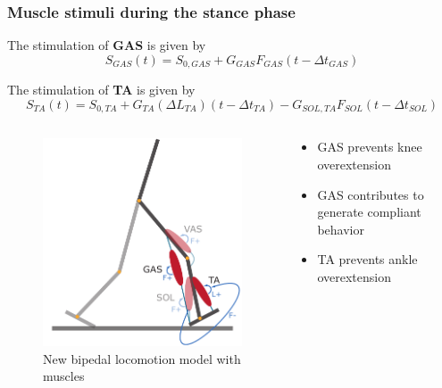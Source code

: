 \documentclass[10pt]{beamer}
\begin{document}
\begin{frame}
	\frametitle{Muscle stimuli during the stance phase}
	
	\begin{block}{}
		The stimulation of \textbf{GAS} is given by
		\begin{equation*}
			S_{GAS}(t)=S_{0,GAS} + G_{GAS} F_{GAS} (t-\Delta t_{GAS})
		\end{equation*}
	\end{block}
	\begin{block}{}
		The stimulation of \textbf{TA} is given by	
		\begin{equation*}
			S_{TA}(t)=S_{0,TA} + G_{TA} (\Delta L_{TA}) (t-\Delta t_{TA}) - G_{SOL,TA} F_{SOL} (t-\Delta t_{SOL})
		\end{equation*}
	\end{block}		

		
	\begin{columns}
		\begin{column}{.5\textwidth}
			\begin{figure}
				\centering
				\includegraphics[height=.45\textheight]{images/new_model/stance/muscle_vas_sol_gas_ta.pdf}
				\caption{New bipedal locomotion model with muscles}	
			\end{figure}
		\end{column}
		\begin{column}{.5\textwidth}
			\begin{itemize}
				\item GAS prevents knee overextension 
				\item GAS contributes to generate compliant behavior 
				\item TA prevents ankle overextension
			\end{itemize}
		\end{column}
	\end{columns}
\end{frame}
\end{document}
